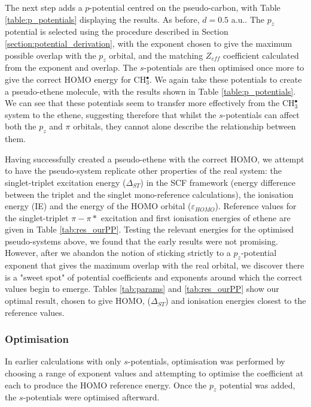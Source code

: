\documentclass[aip]{revtex4-1}
\begin{document}
The next step adds a \(p\)-potential centred on the pseudo-carbon, with Table \ref{table:p_potentials} displaying the results. As before, \(d = 0.5\) a.u.. The \(p_{z}\) potential is selected using the procedure described in Section \ref{section:potential_derivation}, with the exponent chosen to give the maximum possible overlap with the \(p_{z}\) orbital, and the matching \(Z_{eff}\) coefficient calculated from the exponent and overlap. The \(s\)-potentials are then optimised once more to give the correct HOMO energy for CH\(^{\bullet}_{3}\). We again take these potentials to create a pseudo-ethene molecule, with the results shown in Table \ref{table:p_potentials}. We can see that these potentials seem to transfer more effectively from the CH\(^{\bullet}_{3}\) system to the ethene, suggesting therefore that whilst the \(s\)-potentials can affect both the \(p_{z}\) and \(\pi\) orbitals, they 
cannot alone describe the relationship between them.

Having successfully created a pseudo-ethene with the correct HOMO, we attempt to have the pseudo-system replicate other properties of the real system:
the singlet-triplet excitation energy ($\Delta_{ST}$) in the SCF framework (energy difference between the triplet and the singlet mono-reference
calculations), the ionisation energy (IE) and the energy of the HOMO orbital ($\varepsilon_{HOMO}$). Reference values for the singlet-triplet \(\pi-\pi*\) excitation and first ionisation energies of ethene are given in Table \ref{tab:res_ourPP}. Testing the relevant energies for the optimised pseudo-systems above, we found that the early results were not promising. However, after we abandon the notion of sticking strictly to a \(p_{z}\)-potential exponent that gives the maximum overlap with the real orbital, we discover there is a "sweet spot" of potential coefficients and exponents around which the correct values begin to emerge. Tables \ref{tab:params} and  \ref{tab:res_ourPP} show our optimal result, chosen to give HOMO, ($\Delta_{ST}$) and ionisation energies closest to the reference values. 

\subsubsection{Optimisation}

In earlier calculations with only \(s\)-potentials, optimisation was performed by choosing a range of exponent values and attempting to optimise the coefficient at each to produce the HOMO reference energy. Once the \(p_{z}\) potential was added, the \(s\)-potentials were optimised afterward. 
\end{document}
